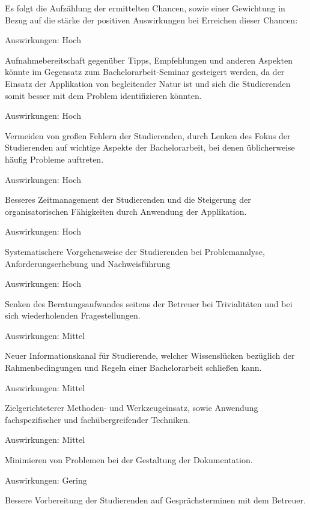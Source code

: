 \documentclass{scrreprt}
\begin{document}
\par \bigskip Es folgt die Aufzählung der ermittelten Chancen, sowie einer Gewichtung in Bezug auf die stärke der positiven Auswirkungen bei Erreichen dieser Chancen:

\begin{enumerate} [label=\textit{[C\arabic*]}]
\item 
\par Auswirkungen: Hoch
\par Aufnahmebereitschaft gegenüber Tipps, Empfehlungen und anderen Aspekten könnte im Gegensatz zum Bachelorarbeit-Seminar gesteigert werden, da der Einsatz der Applikation von begleitender Natur ist und sich die Studierenden somit besser mit dem Problem identifizieren könnten.
\item
\par Auswirkungen: Hoch
\par Vermeiden von großen Fehlern der Studierenden, durch Lenken des Fokus der Studierenden auf wichtige Aspekte der Bachelorarbeit, bei denen üblicherweise häufig Probleme auftreten.
\item
\par Auswirkungen: Hoch
\par Besseres Zeitmanagement der Studierenden und die Steigerung der organisatorischen Fähigkeiten durch Anwendung der Applikation.
\item
\par Auswirkungen: Hoch
\par Systematischere Vorgehensweise der Studierenden bei Problemanalyse, Anforderungserhebung und Nachweisführung
\item
\par Auswirkungen: Hoch
\par Senken des Beratungsaufwandes seitens der Betreuer bei Trivialitäten und bei sich wiederholenden Fragestellungen.
\item 
\par Auswirkungen: Mittel
\par Neuer Informationskanal für Studierende, welcher Wissenslücken bezüglich der Rahmenbedingungen und Regeln einer Bachelorarbeit schließen kann.
\item
\par Auswirkungen: Mittel
\par Zielgerichteterer Methoden- und Werkzeugeinsatz, sowie Anwendung fachspezifischer und fachübergreifender Techniken.
\item
\par Auswirkungen: Mittel
\par Minimieren von Problemen bei der Gestaltung der Dokumentation.
\item
\par Auswirkungen: Gering
\par Bessere Vorbereitung der Studierenden auf Gesprächsterminen mit dem Betreuer.
\end{enumerate}
\end{document}
